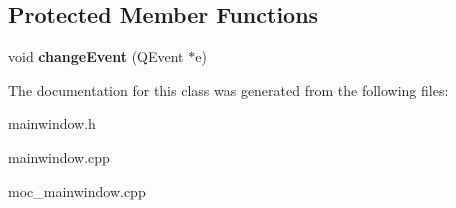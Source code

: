 \subsection*{Protected Member Functions}
\begin{DoxyCompactItemize}
\item 
\hypertarget{classMainWindow_af4ca5d0d3d18ddcb7d54b6596bbf4797}{
void {\bfseries changeEvent} (QEvent $\ast$e)}
\label{classMainWindow_af4ca5d0d3d18ddcb7d54b6596bbf4797}

\end{DoxyCompactItemize}


The documentation for this class was generated from the following files:\begin{DoxyCompactItemize}
\item 
mainwindow.h\item 
mainwindow.cpp\item 
moc\_\-mainwindow.cpp\end{DoxyCompactItemize}
